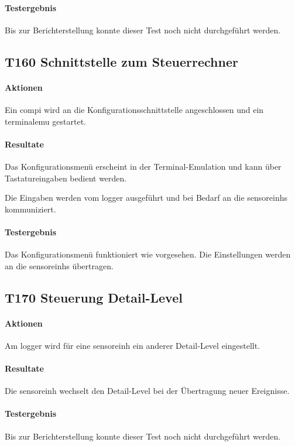 \paragraph{Testergebnis} Bis zur Berichterstellung konnte dieser Test noch nicht durchgeführt werden.

\subsection{T160 Schnittstelle zum Steuerrechner}
\paragraph{Aktionen} Ein \gls{compi} wird an die Konfigurationsschnittstelle angeschlossen und ein \gls{terminalemu} gestartet.

\paragraph{Resultate} Das Konfigurationsmenü erscheint in der Terminal-Emulation und kann über Tastatureingaben bedient werden.

Die Eingaben werden vom \gls{logger} ausgeführt und bei Bedarf an die \glspl{sensoreinh} kommuniziert.

\paragraph{Testergebnis} Das Konfigurationsmenü funktioniert wie vorgesehen. Die Einstellungen werden an die \glspl{sensoreinh} übertragen.

\subsection{T170 Steuerung Detail-Level}
\paragraph{Aktionen} Am \gls{logger} wird für eine \gls{sensoreinh} ein anderer Detail-Level eingestellt.

\paragraph{Resultate} Die \gls{sensoreinh} wechselt den Detail-Level bei der Übertragung neuer Ereignisse.

\paragraph{Testergebnis} Bis zur Berichterstellung konnte dieser Test noch nicht durchgeführt werden.

